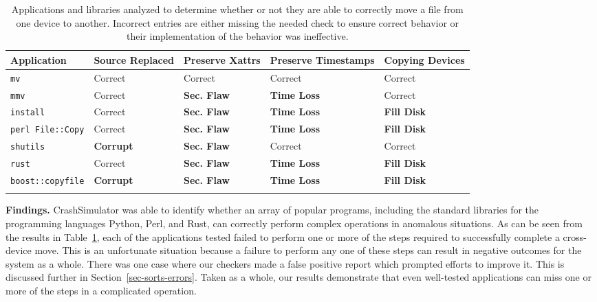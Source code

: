  \begin{table}[t]
    \scriptsize{}
    \begin{tabular}{l p{1cm} p{1cm} p{1.2cm} p{1cm}}
    \toprule{}
        Application     & Source Replaced & Preserve Xattrs & Preserve Timestamps & Copying Devices\\
\hline
        {\tt mv}              & Correct             & Correct         & Correct             & Correct\\
        {\tt mmv}             & Correct             & {\bf Sec. Flaw} & {\bf Time Loss} & Correct\\
        {\tt install}         & Correct             & {\bf Sec. Flaw} & {\bf Time Loss} & {\bf Fill Disk} \\
        {\tt perl File::Copy} & Correct             & {\bf Sec. Flaw} & {\bf Time Loss} & {\bf Fill Disk} \\
        {\tt shutils}         & {\bf Corrupt}	& {\bf Sec. Flaw} 	& Correct             & Correct\\
        {\tt rust}             & Correct             & {\bf Sec. Flaw} & {\bf Time Loss} & {\bf Fill Disk} \\
        {\tt boost::copyfile} & {\bf Corrupt}	      & {\bf Sec. Flaw} & {\bf Time Loss} & {\bf Fill Disk} \\
    \bottomrule{}
    \end{tabular}
    \caption{Applications and libraries analyzed to determine whether or not
      they are able to correctly move a file from one device to another.
Incorrect entries are either missing the needed check to ensure correct
     behavior or their implementation of the behavior was ineffective.}
    \label{table:crossdevice}
\end{table}

{\bf Findings.}
CrashSimulator was able to identify whether an array of popular programs,
including the standard libraries for the programming languages Python,
Perl,
and Rust,
can correctly perform complex
operations in anomalous situations.
As can be seen from the results in Table~\ref{table:crossdevice}, each of the
applications tested failed to perform one or more of the steps required to
successfully complete a cross-device move.  This is an unfortunate situation
because a failure to perform any one of these steps can result in negative
outcomes for the system as a whole.  There was one case where our
checkers made a false positive report which prompted efforts to improve it.
This is discussed further in
Section~\ref{sec-sorts-errors}.
Taken as a whole, our results demonstrate that even well-tested applications
can miss one or more of the steps in a complicated operation.

